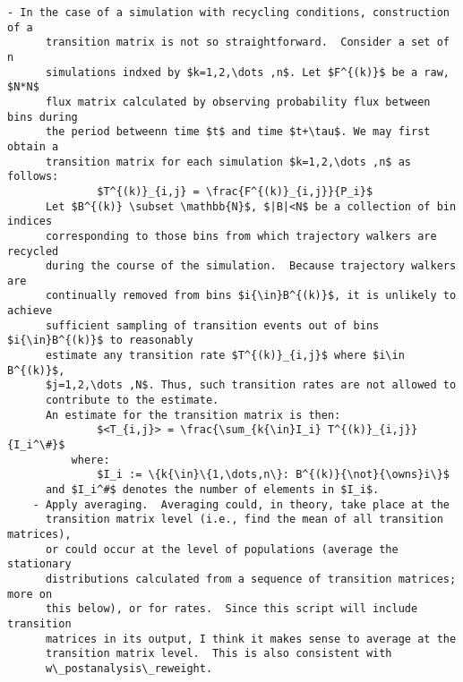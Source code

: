 \documentclass[10pt]{article}
\begin{document}
\begin{Verbatim}[commandchars=\\\{\},codes={\catcode`$=3\catcode`^=7\catcode`_=8}]
    - In the case of a simulation with recycling conditions, construction of a 
      transition matrix is not so straightforward.  Consider a set of n
      simulations indxed by $k=1,2,\dots ,n$. Let $F^{(k)}$ be a raw, $N*N$ 
      flux matrix calculated by observing probability flux between bins during 
      the period betweenn time $t$ and time $t+\tau$. We may first obtain a
      transition matrix for each simulation $k=1,2,\dots ,n$ as follows: 
              $T^{(k)}_{i,j} = \frac{F^{(k)}_{i,j}}{P_i}$
      Let $B^{(k)} \subset \mathbb{N}$, $|B|<N$ be a collection of bin indices 
      corresponding to those bins from which trajectory walkers are recycled 
      during the course of the simulation.  Because trajectory walkers are 
      continually removed from bins $i{\in}B^{(k)}$, it is unlikely to achieve 
      sufficient sampling of transition events out of bins $i{\in}B^{(k)}$ to reasonably 
      estimate any transition rate $T^{(k)}_{i,j}$ where $i\in B^{(k)}$, 
      $j=1,2,\dots ,N$. Thus, such transition rates are not allowed to
      contribute to the estimate.
      An estimate for the transition matrix is then:
              $<T_{i,j}> = \frac{\sum_{k{\in}I_i} T^{(k)}_{i,j}}{I_i^\#}$ 
          where:
              $I_i := \{k{\in}\{1,\dots,n\}: B^{(k)}{\not}{\owns}i\}$
      and $I_i^#$ denotes the number of elements in $I_i$.
    - Apply averaging.  Averaging could, in theory, take place at the
      transition matrix level (i.e., find the mean of all transition matrices),
      or could occur at the level of populations (average the stationary
      distributions calculated from a sequence of transition matrices; more on 
      this below), or for rates.  Since this script will include transition 
      matrices in its output, I think it makes sense to average at the
      transition matrix level.  This is also consistent with 
      w\_postanalysis\_reweight.


\end{Verbatim}
\end{document}
